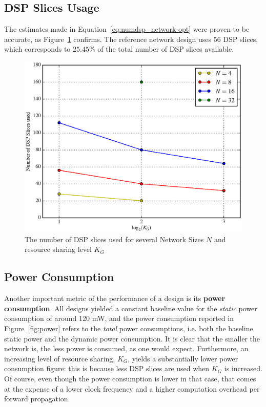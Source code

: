 \subsection{DSP Slices Usage}\label{sec:res-synth-dsp}
The estimates made in Equation~\ref{eq:numdsp_network-opt} were proven to be accurate, as Figure~\ref{fig:dspused} confirms. The reference network design uses 56 DSP slices, which
corresponds to $25.45\%$ of the total number of DSP slices available.

\begin{figure}
    \centering
    \includegraphics[width=\linewidth]{figures/dspuse.eps}
    \caption[The number of DSP slices used for several Network Sizes $N$ and resource sharing level $K_G$]{The number of DSP slices used for several Network Sizes $N$ and resource sharing level $K_G$}
    \label{fig:dspused}
\end{figure}

\subsection{Power Consumption}\label{sec:res-synth-power}
Another important metric of the performance of a design is its \textbf{power consumption}. All designs yielded a constant baseline value for the \emph{static} power consumption of around 120 mW,
and the power consumption reported in Figure~\ref{fig:power} refers to the \emph{total} power consumptions, i.e. both the baseline static power and the dynamic power consumption.
It is clear that the smaller the network is, the less power is consumed, as one would expect. Furthermore, an increasing level of resource sharing, $K_G$, yields a substantially lower
power consumption figure: this is because less DSP slices are used when $K_G$ is increased. Of course, even though the power consumption is lower in that case, that comes at the
expense of a lower clock frequency and a higher computation overhead per forward propagation.

